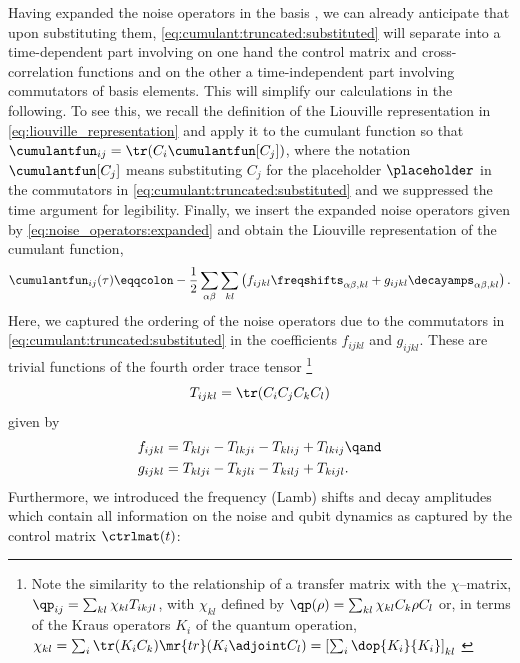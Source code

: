 Having expanded the noise operators in the basis \basis, we can already anticipate that upon substituting them, \cref{eq:cumulant:truncated:substituted} will separate into a time-dependent part involving on one hand the control matrix and cross-correlation functions and on the other a time-independent part involving commutators of basis elements. This will simplify our calculations in the following. To see this, we recall the definition of the Liouville representation in \cref{eq:liouville_representation} and apply it to the cumulant function so that $\cumulantfun_{ij} = \tr(C_i\cumulantfun[C_j])$, where the notation $\cumulantfun[C_j]$ means substituting $C_j$ for the placeholder $\placeholder$ in the commutators in \cref{eq:cumulant:truncated:substituted} and we suppressed the time argument for legibility. Finally, we insert the expanded noise operators given by \cref{eq:noise_operators:expanded} and obtain the Liouville representation of the cumulant function,
\begin{equation}
    \cumulantfun_{ij}(\tau) \eqqcolon -\frac{1}{2}\sum_{\alpha\beta} \sum_{kl}\left(
        f_{ijkl}\freqshifts_{\alpha\beta,kl} + g_{ijkl}\decayamps_{\alpha\beta,kl}
    \right). \label{eq:cumulant:truncated:liouville}
\end{equation}
Here, we captured the ordering of the noise operators due to the commutators in \cref{eq:cumulant:truncated:substituted} in the coefficients $f_{ijkl}$ and $g_{ijkl}$. These are trivial functions of the fourth order trace tensor
\footnote{Note the similarity to the relationship of a transfer matrix with the $\chi$--matrix, $\qp_{ij} = \sum_{kl}\chi_{kl} T_{i k j l}$, with $\chi_{kl}$ defined by $\qp(\rho) = \sum_{kl}\chi_{kl} C_k\rho C_l$ or, in terms of the Kraus operators $K_i$ of the quantum operation, $\chi_{kl} = \sum_i \tr(K_i C_k) \mr{tr}(K_i\adjoint C_l)  = \left[\sum_i\dop{K_i}{K_i}\right]_{kl}$ \cite{Greenbaum2015}}
\begin{equation}\label{eq:trace_tensor}
    T_{ijkl} = \tr(C_i C_j C_k C_l)
\end{equation}
given by
\begin{subequations}
\begin{align}\label{eq:structure_constants}
    f_{ijkl} &= T_{klji} - T_{lkji} - T_{klij} + T_{lkij}\qand \\
    g_{ijkl} &= T_{klji} - T_{kjli} - T_{kilj} + T_{kijl}.
\end{align}
\end{subequations}
Furthermore, we introduced the frequency (Lamb) shifts \freqshifts and decay amplitudes \decayamps which contain all information on the noise and qubit dynamics as captured by the control matrix $\ctrlmat(t)$:
